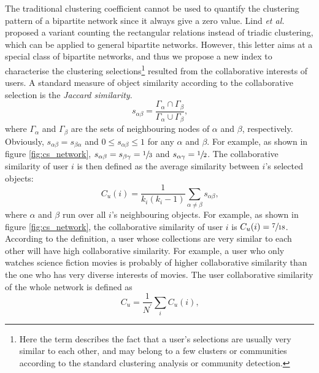       The traditional clustering coefficient\cite{WattsStrogatz1998} cannot be used to quantify the clustering pattern of a bipartite network since it always give a zero value. Lind \textit{et al.}\cite{LindGonzalezHerrmann2005} proposed a variant counting the rectangular relations instead of triadic clustering, which can be applied to general bipartite networks. However, this letter aims at a special class of bipartite networks, and thus we propose a new index to characterise the clustering selections\footnote{Here the term  describes the fact that a user's selections are usually very similar to each other, and may belong to a few clusters or communities according to the standard clustering analysis or community detection.} resulted from the collaborative interests of users. A standard measure of object similarity according to the collaborative selection is the \emph{Jaccard similarity}\cite{Jaccard1901}.
      \begin{equation}
        s_{\alpha\beta} = \frac{\Gamma_\alpha \cap \Gamma_\beta}{\Gamma_\alpha \cup \Gamma_\beta}\mbox{,}
      \end{equation}
      where $\Gamma_\alpha$ and $\Gamma_\beta$ are the sets of neighbouring nodes of $\alpha$ and $\beta$, respectively. Obviously, $s_{\alpha\beta} = s_{\beta\alpha}$ and $0 \leq s_{\alpha\beta} \leq 1$ for any $\alpha$ and $\beta$. For example, as shown in figure \ref{fig:cs_network}, $s_{\alpha\beta} = s_{\beta\gamma} = \sfrac{1}{3}$ and $s_{\alpha\gamma} = \sfrac{1}{2}$. The collaborative similarity of user $i$ is then defined as the average similarity between $i$'s selected objects:
      \begin{equation}
        C_u(i) = \frac{1}{k_i(k_i-1)} \sum_{\alpha\neq\beta} s_{\alpha\beta}\mbox{,}
      \end{equation}
      where $\alpha$ and $\beta$ run over all $i$'s neighbouring objects. For example, as shown in figure \ref{fig:cs_network}, the collaborative similarity of user $i$ is $C_u(i) = \sfrac{7}{18}$. According to the definition, a user whose collections are very similar to each other will have high collaborative similarity. For example, a user who only watches science fiction movies is probably of higher collaborative similarity than the one who has very diverse interests of movies. The user collaborative similarity of the whole network is defined as
      \begin{equation}
        C_u = \frac{1}{N^\prime} \sum_{i} C_u(i)\mbox{,}
      \end{equation}
